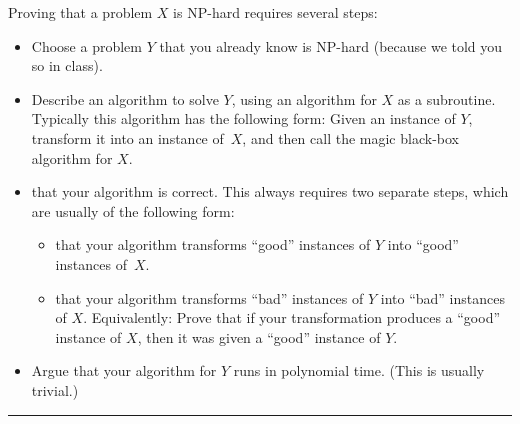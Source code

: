 \documentclass[11pt]{article}
\begin{document}

\noindent
Proving that a problem $X$ is {NP}-hard requires several steps:
\begin{itemize}
\item
Choose a problem $Y$ that you already know is {NP}-hard (because we told you so in class).
\item
Describe an algorithm to solve $Y$, using an algorithm for $X$ as a subroutine.  Typically this algorithm has the following form:  Given an instance of $Y$, transform it into an instance of~$X$, and then call the magic black-box algorithm for $X$.
\item
{} that your algorithm is correct.  This always requires two separate steps, which are usually of the following form:
\begin{itemize}
\item
{} that your algorithm transforms “good” instances of $Y$ into “good” instances of~$X$.
\item
{} that your algorithm transforms “bad” instances of $Y$ into “bad” instances of $X$.  Equivalently:  Prove that if your transformation produces a “good” instance of $X$, then it was given a “good” instance of $Y$.
\end{itemize}
\item
Argue that your algorithm for $Y$ runs in polynomial time.  (This is usually trivial.)
\end{itemize}

\hrule
\vspace{12pt}
\end{document}
